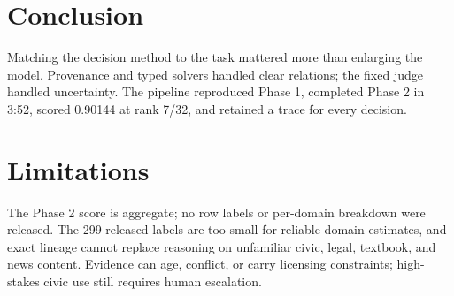 \documentclass[11pt]{article}
\begin{document}
\section{Conclusion}

Matching the decision method to the task mattered more than enlarging the model. Provenance and typed solvers handled clear relations; the fixed judge handled uncertainty. The pipeline reproduced Phase 1, completed Phase 2 in 3:52, scored 0.90144 at rank 7/32, and retained a trace for every decision.

\section*{Limitations}

The Phase 2 score is aggregate; no row labels or per-domain breakdown were released. The 299 released labels are too small for reliable domain estimates, and exact lineage cannot replace reasoning on unfamiliar civic, legal, textbook, and news content. Evidence can age, conflict, or carry licensing constraints; high-stakes civic use still requires human escalation.

\clearpage

\end{document}
